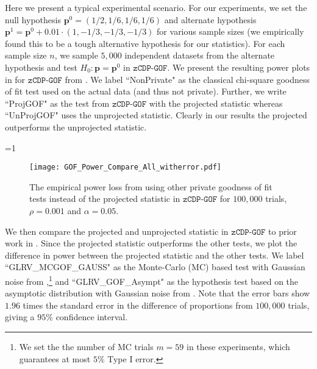 \documentclass[twoside,letterpaper]{article} \usepackage{aistats2017}
\theoremstyle{definition}
\theoremstyle{remark}
\begin{document}
Here we present a typical experimental scenario. For our experiments, we set the null hypothesis ${{\mathbf{p}}^0} = (1/2,1/6,1/6,1/6)$ and alternate hypothesis ${\mathbf{p}}^1 = {{\mathbf{p}}^0} + 0.01 \cdot (1,-1/3,-1/3,-1/3)$ for various sample sizes (we empirically found this to be a tough alternative hypothesis for our statistics).  For each sample size $n$, we sample $5,000$ independent datasets from the alternate hypothesis and test $H_0: {\mathbf{p}} = {{\mathbf{p}}^0}$ in ${\texttt{zCDP-GOF}}$.  We present the resulting power plots in  for ${\texttt{zCDP-GOF}}$ from .
We label  ``NonPrivate" as the classical chi-square goodness of fit test used on the actual data (and thus not private).  Further, we write ``ProjGOF" as the test from ${\texttt{zCDP-GOF}}$ with the projected statistic whereas ``UnProjGOF" uses the unprojected statistic. Clearly in our results the projected outperforms the unprojected statistic.   

=1
\begin{figure}
\centering
\texttt{[image: GOF\_Power\_Compare\_All\_witherror.pdf]}
\caption{\small The empirical power loss from using other private goodness of fit tests instead of the projected statistic in ${\texttt{zCDP-GOF}}$ 
for $100,000$ trials, $\rho =0.001$ and $\alpha = 0.05$. \label{fig:power_gof_compare}}
\end{figure}
\fi

We then compare the projected and unprojected statistic in ${\texttt{zCDP-GOF}}$ to prior work in . Since the projected statistic outperforms the other tests, we plot the difference in power between the projected statistic and the other tests.
We label ``GLRV\_MCGOF\_GAUSS" as the Monte-Carlo (MC) based test with Gaussian noise from \cite{GLRV16},\footnote{We set the the number of MC trials $m = 59$ in these experiments, which guarantees at most $5\%$ Type I error.} and ``GLRV\_GOF\_Asympt" as the hypothesis test based on the asymptotic distribution with Gaussian noise from \cite{GLRV16,WLK15}.  
Note that the error bars show $1.96$ times the standard error in the difference of proportions from $100,000$ trials, giving a $95\%$ confidence interval.
\end{document}
